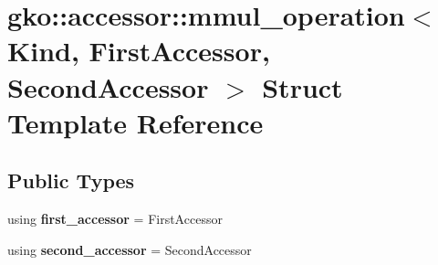 \hypertarget{structgko_1_1accessor_1_1mmul__operation}{}\section{gko\+:\+:accessor\+:\+:mmul\+\_\+operation$<$ Kind, First\+Accessor, Second\+Accessor $>$ Struct Template Reference}
\label{structgko_1_1accessor_1_1mmul__operation}
\subsection*{Public Types}
\begin{DoxyCompactItemize}
\item 
\mbox{\label{structgko_1_1accessor_1_1mmul__operation_a8de9b9e6f536e3c8cfa75a478eedeb72}} 
using {\bfseries first\+\_\+accessor} = First\+Accessor
\item 
\mbox{\label{structgko_1_1accessor_1_1mmul__operation_a05a1c9e665fd577a09af8e4107f8b9de}} 
using {\bfseries second\+\_\+accessor} = Second\+Accessor
\end{DoxyCompactItemize}
